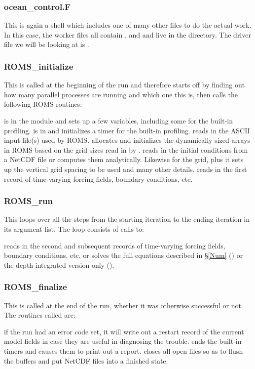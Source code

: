 \subsubsection{ocean\_control.F}
This is again a shell which includes one of many other files to do
the actual work. In this case, the worker files all contain
,  and 
and live in the  directory. The driver file we
will be looking at is .

\subsubsection{ROMS\_initialize}
This is called at the beginning of the run and therefore starts off
by finding out how many parallel processes are running and which one
this is, then calls the following ROMS routines:
\begin{klist}
   is in the  module and
  sets up a few variables, including some for the built-in profiling.
   is in  and initializes a timer for
  the built-in profiling.
   reads in the ASCII input file(s) used by ROMS.
   allocates and initializes the dynamically sized
  arrays in ROMS based on the grid sizes read in by .
   reads in the initial conditions from a NetCDF file or
  computes them analytically. Likewise for the grid, plus it sets up the
  vertical grid spacing to be used and many other details.
   reads in the first record of time-varying forcing
  fields, boundary conditions, etc.
\end{klist}

\subsubsection{ROMS\_run}
This loops over all the steps from the starting iteration to the ending
iteration in its argument list. The loop consists of calls to:
\begin{klist}
   reads in the second and subsequent records of
  time-varying forcing fields, boundary conditions, etc.
   or  solves the full
  equations described in \S\ref{Num} () or the depth-integrated
  version only ().
\end{klist}

\subsubsection{ROMS\_finalize}
This is called at the end of the run, whether it was otherwise
successful or not. The routines called are:
\begin{klist}
   if the run had an error code set, it will write out a
  restart record of the current model fields in case they are useful in
  diagnosing the trouble.
   ends the built-in timers and causes them to print
  out a report.
   closes all open files so as to flush the buffers
  and put NetCDF files into a finished state.
\end{klist}

